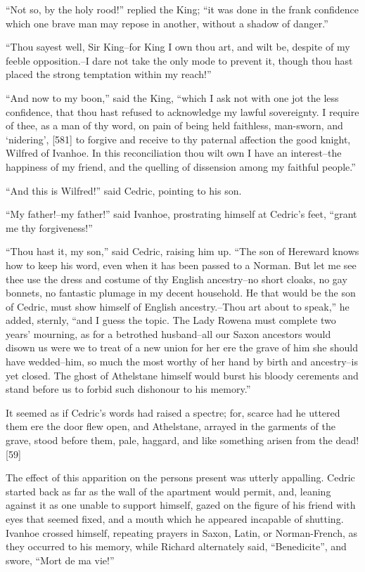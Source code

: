 ``Not so, by the holy rood!'' replied the King; ``it was done in the
frank confidence which one brave man may repose in another, without a
shadow of danger.''

``Thou sayest well, Sir King--for King I own thou art, and wilt be,
despite of my feeble opposition.--I dare not take the only mode to
prevent it, though thou hast placed the strong temptation within my
reach!''

``And now to my boon,'' said the King, ``which I ask not with one jot
the less confidence, that thou hast refused to acknowledge my lawful
sovereignty. I require of thee, as a man of thy word, on pain of being
held faithless, man-sworn, and `nidering', {[}581{]} to forgive and
receive to thy paternal affection the good knight, Wilfred of Ivanhoe.
In this reconciliation thou wilt own I have an interest--the happiness
of my friend, and the quelling of dissension among my faithful people.''

``And this is Wilfred!'' said Cedric, pointing to his son.

``My father!--my father!'' said Ivanhoe, prostrating himself at Cedric's
feet, ``grant me thy forgiveness!''

``Thou hast it, my son,'' said Cedric, raising him up. ``The son of
Hereward knows how to keep his word, even when it has been passed to a
Norman. But let me see thee use the dress and costume of thy English
ancestry--no short cloaks, no gay bonnets, no fantastic plumage in my
decent household. He that would be the son of Cedric, must show himself
of English ancestry.--Thou art about to speak,'' he added, sternly,
``and I guess the topic. The Lady Rowena must complete two years'
mourning, as for a betrothed husband--all our Saxon ancestors would
disown us were we to treat of a new union for her ere the grave of him
she should have wedded--him, so much the most worthy of her hand by
birth and ancestry--is yet closed. The ghost of Athelstane himself would
burst his bloody cerements and stand before us to forbid such dishonour
to his memory.''

It seemed as if Cedric's words had raised a spectre; for, scarce had he
uttered them ere the door flew open, and Athelstane, arrayed in the
garments of the grave, stood before them, pale, haggard, and like
something arisen from the dead! {[}59{]}

The effect of this apparition on the persons present was utterly
appalling. Cedric started back as far as the wall of the apartment would
permit, and, leaning against it as one unable to support himself, gazed
on the figure of his friend with eyes that seemed fixed, and a mouth
which he appeared incapable of shutting. Ivanhoe crossed himself,
repeating prayers in Saxon, Latin, or Norman-French, as they occurred to
his memory, while Richard alternately said, ``Benedicite'', and swore,
``Mort de ma vie!''

